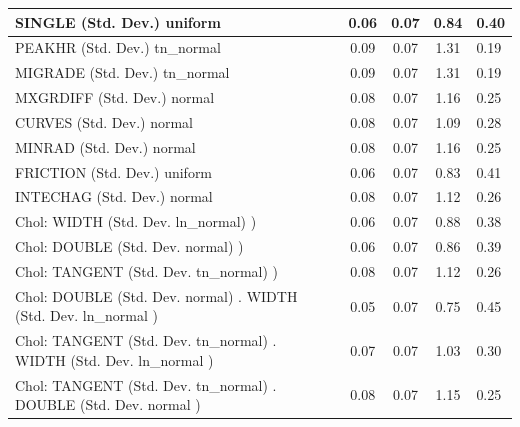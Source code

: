 \begin{table}
\begin{center}
\begin{tabular}{|l|l|c|c|c|l|}
			SINGLE (Std. Dev.) uniform &  & 0.06 & 0.07 & 0.84 & 0.40 \\
			\hline
			PEAKHR (Std. Dev.) tn_normal &  & 0.09 & 0.07 & 1.31 & 0.19 \\
			\hline
			MIGRADE (Std. Dev.) tn_normal &  & 0.09 & 0.07 & 1.31 & 0.19 \\
			\hline
			MXGRDIFF (Std. Dev.) normal &  & 0.08 & 0.07 & 1.16 & 0.25 \\
			\hline
			CURVES (Std. Dev.) normal &  & 0.08 & 0.07 & 1.09 & 0.28 \\
			\hline
			MINRAD (Std. Dev.) normal &  & 0.08 & 0.07 & 1.16 & 0.25 \\
			\hline
			FRICTION (Std. Dev.) uniform &  & 0.06 & 0.07 & 0.83 & 0.41 \\
			\hline
			INTECHAG (Std. Dev.) normal &  & 0.08 & 0.07 & 1.12 & 0.26 \\
			\hline
			 Chol: WIDTH (Std. Dev. ln_normal) ) &  & 0.06 & 0.07 & 0.88 & 0.38 \\
			\hline
			 Chol: DOUBLE (Std. Dev. normal) ) &  & 0.06 & 0.07 & 0.86 & 0.39 \\
			\hline
			 Chol: TANGENT (Std. Dev. tn_normal) ) &  & 0.08 & 0.07 & 1.12 & 0.26 \\
			\hline
			 Chol: DOUBLE (Std. Dev. normal) . WIDTH (Std. Dev.   ln_normal ) &  & 0.05 & 0.07 & 0.75 & 0.45 \\
			\hline
			 Chol: TANGENT (Std. Dev. tn_normal) . WIDTH (Std. Dev.   ln_normal ) &  & 0.07 & 0.07 & 1.03 & 0.30 \\
			\hline
			 Chol: TANGENT (Std. Dev. tn_normal) . DOUBLE (Std. Dev.   normal ) &  & 0.08 & 0.07 & 1.15 & 0.25 \\
			\hline
		\end{tabular}
	\end{center}
\end{table}